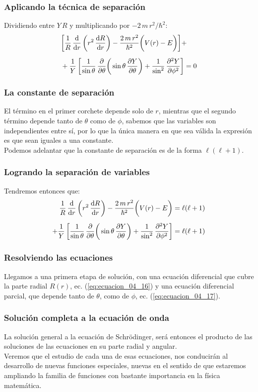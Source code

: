 \documentclass[12pt]{beamer}
\begin{document}
\begin{frame}
\frametitle{Aplicando la técnica de separación}
Dividiendo entre $Y \, R$ y multiplicando por $-2 \, m \, r^{2} / \hbar^{2}$:
\pause
\begin{align*}
&\bigg[ \dfrac{1}{R} \, \dv{r} \left( r^{2} \, \dv{R}{r} \right) - \dfrac{2 \, m \, r^{2}}{\hbar^{2}} \bigg( V(r) - E \bigg) \bigg] + \\[0.5em]
&+ \dfrac{1}{Y} \left[ \dfrac{1}{\sin \theta} \, \pdv{\theta} \bigg( \sin \theta \, \pdv{Y}{\theta} \bigg) + \dfrac{1}{\sin^{2}} \, \pdv[2]{Y}{\phi} \right] = 0
\end{align*}
\end{frame}
\begin{frame}
\frametitle{La constante de separación}
El término en el primer corchete depende solo de $r$, mientras que el segundo término depende tanto de $\theta$ como de $\phi$, sabemos que las variables son independientes entre sí, por lo que la única manera en que sea válida la expresión es que sean iguales a una constante.
\\
\bigskip
\pause
Podemos adelantar que la constante de separación es de la forma $\ell(\ell + 1)$.
\end{frame}
\begin{frame}
\frametitle{Logrando la separación de variables}
Tendremos entonces que:
\begin{align}
\dfrac{1}{R} \, \dv{r} \left( r^{2} \, \dv{R}{r} \right) - \dfrac{2 \, m \, r^{2}}{\hbar^{2}} \bigg( V(r) - E \bigg) &= \ell (\ell + 1) \label{eq:ecuacion_04_16} \\[0.5em]
+ \dfrac{1}{Y} \left[ \dfrac{1}{\sin \theta} \, \pdv{\theta} \bigg( \sin \theta \, \pdv{Y}{\theta} \bigg) + \dfrac{1}{\sin^{2}} \, \pdv[2]{Y}{\phi} \right] &= \ell (\ell + 1) \label{eq:ecuacion_04_17}    
\end{align}
\end{frame}
\begin{frame}
\frametitle{Resolviendo las ecuaciones}
Llegamos a una primera etapa de solución, con una ecuación diferencial que cubre la parte radial $R(r)$, ec. (\ref{eq:ecuacion_04_16}) y una ecuación diferencial parcial, que depende tanto de $\theta$, como de $\phi$, ec. (\ref{eq:ecuacion_04_17}).
\end{frame}
\begin{frame}
\frametitle{Solución completa a la ecuación de onda}
La solución general a la ecuación de Schrödinger, será entonces el producto de las soluciones de las ecuaciones en su parte radial y angular.
\\
\bigskip
\pause
Veremos que el estudio de cada una de esas ecuaciones, nos conducirán al desarrollo de nuevas funciones especiales, nuevas en el sentido de que estaremos ampliando la familia de funciones con bastante importancia en la física matemática.
\end{frame}
\end{document}
